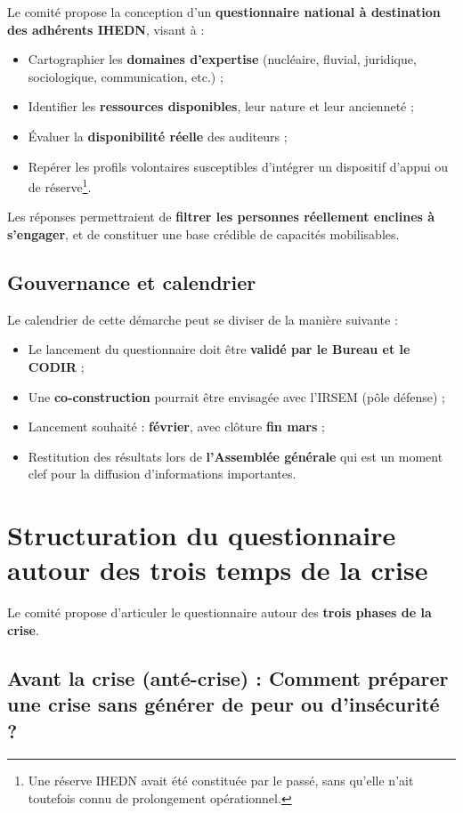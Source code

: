 \documentclass[12pt,a4paper]{article}
\begin{document}
Le comité propose la conception d'un \textbf{questionnaire national à destination des adhérents IHEDN}, visant à :

\begin{itemize}
\item Cartographier les \textbf{domaines d'expertise} (nucléaire, fluvial, juridique, sociologique, communication, etc.) ;
\item Identifier les \textbf{ressources disponibles}, leur nature et leur ancienneté ;
\item Évaluer la \textbf{disponibilité réelle} des auditeurs ;
\item Repérer les profils volontaires susceptibles d'intégrer un dispositif d'appui ou de réserve\footnote{Une réserve IHEDN avait été constituée par le passé, sans qu'elle n'ait toutefois connu de prolongement opérationnel.}.
\end{itemize}

Les réponses permettraient de \textbf{filtrer les personnes réellement enclines à s'engager}, et de constituer une base crédible de capacités mobilisables.

\subsection{Gouvernance et calendrier}

Le calendrier de cette démarche peut se diviser de la manière suivante :
\begin{itemize}
\item Le lancement du questionnaire doit être \textbf{validé par le Bureau et le CODIR} ;
\item Une \textbf{co-construction} pourrait être envisagée avec l'IRSEM (pôle défense) ;
\item Lancement souhaité : \textbf{février}, avec clôture \textbf{fin mars} ;
\item Restitution des résultats lors de \textbf{l'Assemblée générale} qui est un moment clef pour la diffusion d'informations importantes.
\end{itemize}

\section{Structuration du questionnaire autour des trois temps de la crise}

Le comité propose d'articuler le questionnaire autour des \textbf{trois phases de la crise}.

\subsection{Avant la crise (anté-crise) : Comment préparer une crise sans générer de peur ou d'insécurité ?}
\end{document}
